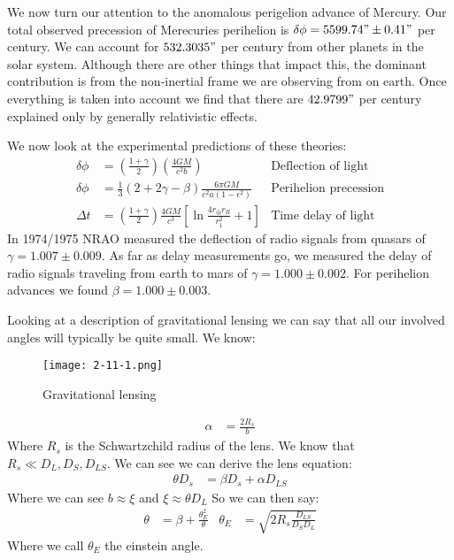 We now turn our attention to the anomalous perigelion advance of Mercury. Our total observed precession of Merecuries perihelion is $\delta\phi = 5599.74" \pm 0.41"$ per century. We can account for $532.3035"$ per century from other planets in the solar system.
Although there are other things that impact this, the dominant contribution is from the non-inertial frame we are observing from on earth. Once everything is taken into account we find that there are $42.9799"$ per century explained only by generally relativistic effects.

We now look at the experimental predictions of these theories:
\begin{align*}
	\delta\phi &= \left(\frac{1+\gamma}{2}\right)\left(\frac{4GM}{c^2 b}\right) & \text{Deflection of light}\\
	\delta\phi &= \frac{1}{3}(2+ 2\gamma-\beta) \frac{6\pi GM}{c^2a(1-\epsilon^2)} & \text{Perihelion precession} \\
	\Delta t &= \left(\frac{1+\gamma}{2}\right) \frac{4GM}{c^3} \left[ \ln \frac{4r_\oplus r_R}{r_1^2} + 1\right] & \text{Time delay of light}
\end{align*}
In 1974/1975 NRAO measured the deflection of radio signals from quasars of $\gamma = 1.007 \pm 0.009$.
As far as delay measurements go, we measured the delay of radio signals traveling from earth to mars of $\gamma = 1.000 \pm 0.002$.
For perihelion advances we found $\beta = 1.000 \pm 0.003$.

Looking at a description of gravitational lensing we can say that all our involved angles will typically be quite small. We know:
\begin{figure*}[h]
	\centering
	\texttt{[image: 2-11-1.png]}
	\caption*{Gravitational lensing}
\end{figure*}
\begin{align*}
	\alpha &= \frac{2R_s}{b}
\end{align*}
Where $R_s$ is the Schwartzchild radius of the lens. We know that $R_s \ll D_L,D_S,D_{LS}$. We can see we can derive the lens equation:
\begin{align*}
	\theta D_s &= \beta D_s + \alpha D_{LS}
\end{align*}
Where we can see $b\approx \xi$ and $\xi \approx \theta D_L$ So we can then say:
\begin{align*}
	\theta &= \beta + \frac{\theta_E^2}{\theta} &
	\theta_E &= \sqrt{2R_s \frac{D_{LS}}{D_S D_L}}
\end{align*}
Where we call $\theta_E$ the einstein angle.

